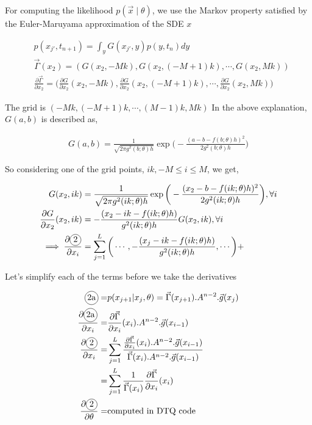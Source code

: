 \documentclass[a4paper,11pt]{article}
\newcommand\encircle[1]{%
\tikz[baseline=(X.base)]
\node (X) [draw, shape=circle, inner sep=0] {\strut #1};}
\begin{document}
\begin{enumerate}
For computing the likelihood $p(\vec{x} \mid \theta)$, we use the Markov property satisfied by the Euler-Maruyama approximation of the SDE $x$

\begin{align*}
& p(x_{j'}, t_{n+1}) = \int_{y} G(x_{j'}, y) p(y, t_n) dy \\
& \vec{\Gamma}(x_2) = (G(x_2, -Mk), G(x_2, (-M+1)k ), \cdots, G(x_2, Mk)) \\
& \frac{\partial \vec{\Gamma}}{\partial x_2} = \bigg( \frac{\partial G}{\partial x_2}(x_2, -Mk), \frac{\partial G}{\partial x_2}(x_2, (-M+1)k), \cdots, \frac{\partial G}{\partial x_2}(x_2, Mk) \bigg)
\end{align*}

The grid is $(-Mk, (-M+1)k, \cdots, (M-1)k, Mk)$ In the above explanation, $G(a,b)$ is described as,

\begin{align*}
G(a,b) = \frac{1}{\sqrt{2 \pi g^2(b; \theta) h}} \exp \bigg( - \frac{(a - b - f(b; \theta)h)^2}{2 g^2(b; \theta)h} \bigg)
\end{align*}

So considering one of the grid points, $ik, -M \leq i \leq M$, we get,

\begin{align*}
G(x_2, ik) & = \frac{1}{\sqrt{2 \pi g^2(ik; \theta) h}} \exp \bigg( - \frac{(x_2 - b - f(ik; \theta)h)^2}{2 g^2(ik; \theta)h} \bigg), \forall i \\
\frac{\partial G}{\partial x_2}(x_2, ik) & = -\frac{(x_2 - ik - f(ik; \theta)h)}{g^2(ik; \theta)h} G(x_2, ik), \forall i \\
\implies \frac{\partial \encircle{2}}{\partial x_i} & = \sum_{j=1}^{L} \bigg( \cdots, -\frac{(x_j - ik - f(ik; \theta)h)}{g^2(ik; \theta)h}, \cdots \bigg) +
\end{align*}
\end{enumerate}

Let's simplify each of the terms before we take the derivatives

\begin{align*}
\encircle{2a} = & p(x_{j+1} | x_j, \theta) = \vec{\Gamma}(x_{j+1}) . A^{n - 2}. \vec{g}(x_{j}) \\
\frac{\partial \encircle{2a}}{\partial x_i} = & \frac{\partial \vec{\Gamma}}{\partial x_i}(x_i) . A^{n- 2}. \vec{g}(x_{i-1})\\
\frac{\partial \encircle{2}}{\partial x_i} = & \sum_{j=1}^{L} \frac{\frac{\partial \vec{\Gamma}}{\partial x_i}(x_i) . A^{n-2}. \vec{g}(x_{i-1})}{\vec{\Gamma}(x_{i}) . A^{n-2}. \vec{g}(x_{i-1})}\\
= & \sum_{j=1}^{L} \frac{1}{\vec{\Gamma}(x_i)} \frac{\partial \vec{\Gamma}}{\partial x_i}(x_i) \\
\frac{\partial \encircle{2}}{\partial \theta} = & \text{computed in DTQ code}
\end{align*}
\end{document}
